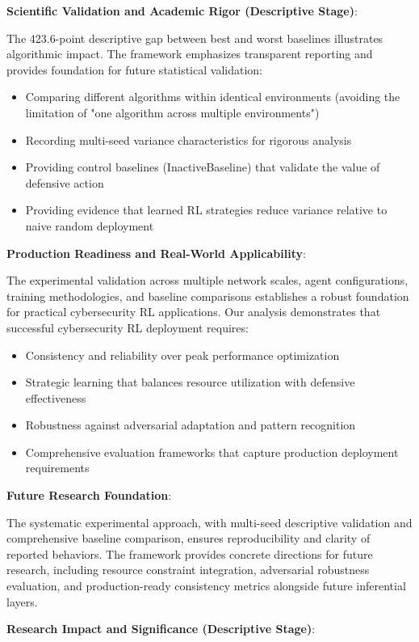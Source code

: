 \documentclass[12pt,twoside]{article}
\theoremstyle{definition}
\theoremstyle{plain}
\begin{document}
	\textbf{Scientific Validation and Academic Rigor (Descriptive Stage)}:

The 423.6-point descriptive gap between best and worst baselines illustrates algorithmic impact. The framework emphasizes transparent reporting and provides foundation for future statistical validation:
\begin{itemize}
\item Comparing different algorithms within identical environments (avoiding the limitation of "one algorithm across multiple environments")
\item Recording multi-seed variance characteristics for rigorous analysis
\item Providing control baselines (InactiveBaseline) that validate the value of defensive action
\item Providing evidence that learned RL strategies reduce variance relative to naive random deployment
\end{itemize}

\textbf{Production Readiness and Real-World Applicability}:

The experimental validation across multiple network scales, agent configurations, training methodologies, and baseline comparisons establishes a robust foundation for practical cybersecurity RL applications. Our analysis demonstrates that successful cybersecurity RL deployment requires:
\begin{itemize}
\item Consistency and reliability over peak performance optimization
\item Strategic learning that balances resource utilization with defensive effectiveness
\item Robustness against adversarial adaptation and pattern recognition
\item Comprehensive evaluation frameworks that capture production deployment requirements
\end{itemize}

\textbf{Future Research Foundation}:

The systematic experimental approach, with multi-seed descriptive validation and comprehensive baseline comparison, ensures reproducibility and clarity of reported behaviors. The framework provides concrete directions for future research, including resource constraint integration, adversarial robustness evaluation, and production-ready consistency metrics alongside future inferential layers.

	\textbf{Research Impact and Significance (Descriptive Stage)}:
\end{document}
